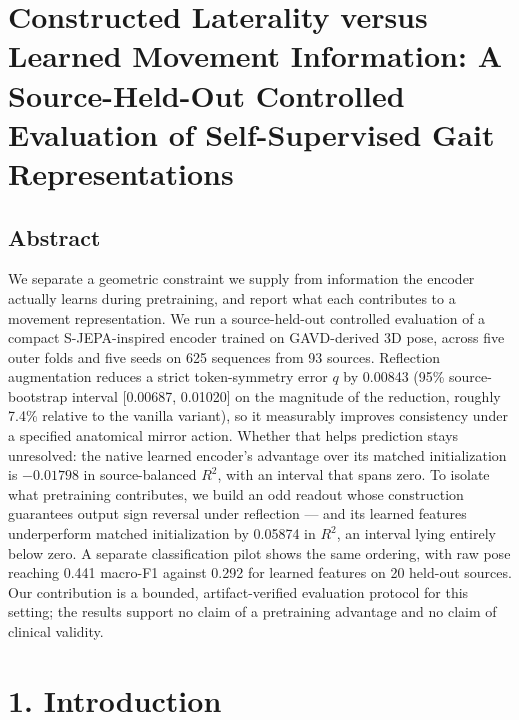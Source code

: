 \documentclass{article}
\title{}
\author{Anonymous Author(s)}
\begin{document}
\maketitle
\section{Constructed Laterality versus Learned Movement Information: A
Source-Held-Out Controlled Evaluation of Self-Supervised Gait
Representations}\label{constructed-laterality-versus-learned-movement-information-a-source-held-out-controlled-evaluation-of-self-supervised-gait-representations}

\subsection{Abstract}\label{abstract}

We separate a geometric constraint we supply from information the
encoder actually learns during pretraining, and report what each
contributes to a movement representation. We run a source-held-out
controlled evaluation of a compact S-JEPA-inspired encoder trained on
GAVD-derived 3D pose, across five outer folds and five seeds on 625
sequences from 93 sources. Reflection augmentation reduces a strict
token-symmetry error \(q\) by 0.00843 (95\% source-bootstrap interval
{[}0.00687, 0.01020{]} on the magnitude of the reduction, roughly 7.4\%
relative to the vanilla variant), so it measurably improves consistency
under a specified anatomical mirror action. Whether that helps
prediction stays unresolved: the native learned encoder's advantage over
its matched initialization is \(-0.01798\) in source-balanced \(R^2\),
with an interval that spans zero. To isolate what pretraining
contributes, we build an odd readout whose construction guarantees
output sign reversal under reflection --- and its learned features
underperform matched initialization by 0.05874 in \(R^2\), an interval
lying entirely below zero. A separate classification pilot shows the
same ordering, with raw pose reaching 0.441 macro-F1 against 0.292 for
learned features on 20 held-out sources. Our contribution is a bounded,
artifact-verified evaluation protocol for this setting; the results
support no claim of a pretraining advantage and no claim of clinical
validity.

\section{1. Introduction}\label{introduction}
\end{document}

